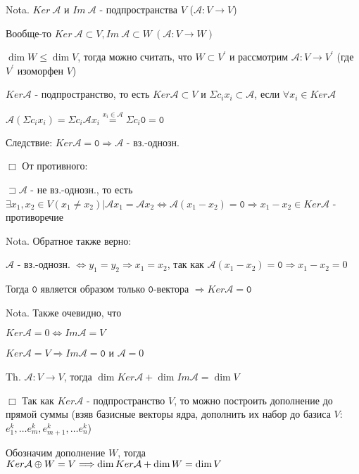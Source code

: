 \documentclass[12pt]{article}
\begin{document}
    Nota. $Ker\ \mathcal{A}$ и $Im\ \mathcal{A}$ - подпространства $V$ ($\mathcal{A} : V \rightarrow V$)

    Вообще-то $Ker\ \mathcal{A} \subset V, Im\ \mathcal{A} \subset W \ (\mathcal{A} : V \rightarrow W)$

    $\dim W \leq \dim V$, тогда можно считать, что $W \subset V^\prime$ и
    рассмотрим $\mathcal{A} : V \rightarrow V^\prime$ (где $V^\prime$ изоморфен $V$)

    $Ker \mathcal{A}$ - подпространство, то есть $Ker \mathcal{A} \subset V$ и
    $\Sigma c_i x_i \subset \mathcal{A}$, если $\forall x_i \in Ker \mathcal{A}$

    $\mathcal{A} (\Sigma c_i x_i) = \Sigma c_i \mathcal{A} x_i \stackrel{x_i \in \mathcal{A}}{=} \Sigma c_i \texttt{0} = \texttt{0}$

    Следствие: $Ker \mathcal{A} = \texttt{0} \Longrightarrow \mathcal{A}$ - вз.-однозн.

    $\Box$ От противного:

    $\sqsupset \mathcal{A}$ - не вз.-однозн., то есть $\exists x_1, x_2 \in V (x_1 \neq x_2) | \mathcal{A}x_1 = \mathcal{A}x_2 \Longleftrightarrow \mathcal{A} (x_1 - x_2) = \texttt{0} \Longrightarrow x_1 - x_2 \in Ker \mathcal{A}$ - противоречие

    Nota. Обратное также верно:

    $\mathcal{A}$ - вз.-однозн. $\Longleftrightarrow y_1 = y_2 \Longrightarrow x_1 = x_2$, так как $\mathcal{A}(x_1 - x_2) = \texttt{0} \Longrightarrow x_1 - x_2 = 0$

    Тогда $\texttt{0}$ является образом только $\texttt{0}$-вектора $\Longrightarrow Ker \mathcal{A} = \texttt{0}$

    Nota. Также очевидно, что

    $Ker \mathcal{A} = 0 \Longleftrightarrow Im \mathcal{A} = V$

    $Ker \mathcal{A} = V \Longrightarrow Im \mathcal{A} = \texttt{0}$ и $\mathcal{A} = 0$

    Th. $\mathcal{A} : V \rightarrow V$, тогда $\dim Ker \mathcal{A} + \dim Im \mathcal{A} = \dim V$

    $\Box$ Так как $Ker \mathcal{A}$ - подпространство $V$, то можно построить дополнение до прямой суммы (взяв базисные векторы ядра, дополнить их набор до базиса $V$: $e^k_1, \dots e^k_m, e^k_{m+1}, \dots e^k_n$)

    Обозначим дополнение $W$, тогда $Ker \mathcal{A} \oplus W = V \Longrightarrow \dim Ker \mathcal{A} + \dim W = \dim V$
\end{document}
